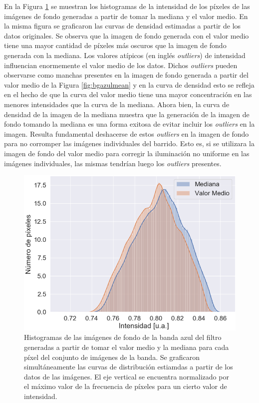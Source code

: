 En la Figura \ref{fig:comparhists} se muestran los histogramas de la intensidad de los píxeles de las imágenes de fondo generadas a partir de tomar la mediana y el valor medio. En la misma figura se graficaron las curvas de densidad estimadas a partir de los datos originales. Se observa que la imagen de fondo generada con el valor medio tiene una mayor cantidad de píxeles más oscuros que la imagen de fondo generada con la mediana. Los valores atípicos (en inglés \textit{outliers}) de intensidad influencian enormemente el valor medio de los datos. Dichos \textit{outliers} pueden observarse como manchas presentes en la imagen de fondo generada a partir del valor medio de la Figura \ref{fig:bgazulmean} y en la curva de densidad esto se refleja en el hecho de que la curva del valor medio tiene una mayor concentración en las menores intensidades que la curva de la mediana. Ahora bien, la curva de densidad de la imagen de la mediana muestra que la generación de la imagen de fondo tomando la mediana es una forma exitosa de evitar incluir los \textit{outliers} en la imagen. Resulta fundamental deshacerse de estos \textit{outliers} en la imagen de fondo para no corromper las imágenes individuales del barrido. Esto es, si se utilizara la imagen de fondo del valor medio para corregir la iluminación no uniforme en las imágenes individuales, las mismas tendrían luego los \textit{outliers} presentes.
\begin{figure}[H]
	\centering
\includegraphics[scale=0.7]{Figs/defectosZEISS/comparhistsmedi.png}
\caption{Histogramas de las imágenes de fondo de la banda azul del filtro generadas a partir de tomar el valor medio y la mediana para cada píxel del conjunto de imágenes de la banda. Se graficaron simultáneamente las curvas de distribución estiamdas a partir de los datos de las imágenes. El eje vertical se encuentra normalizado por el máximo valor de la frecuencia de píxeles para un cierto valor de intensidad.}
\label{fig:comparhists}
\end{figure}	
